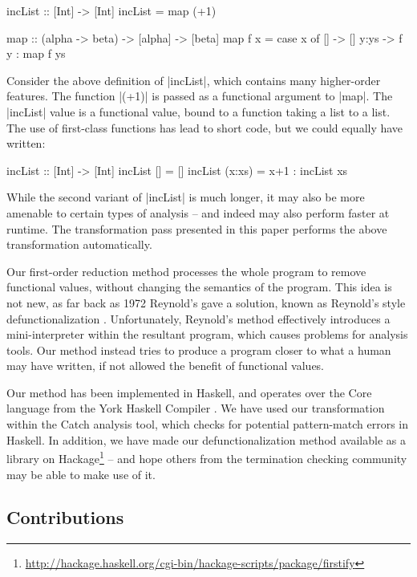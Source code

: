 \documentclass[preprint]{sigplanconf}
\begin{document}
\begin{example}
\label{ex:incList}
\begin{code}
incList :: [Int] -> [Int]
incList = map (+1)

map :: (alpha -> beta) -> [alpha] -> [beta]
map f x = case  x of
                []    -> []
                y:ys  -> f y : map f ys
\end{code}

Consider the above definition of |incList|, which contains many higher-order features. The function |(+1)| is passed as a functional argument to |map|. The |incList| value is a functional value, bound to a function taking a list to a list. The use of first-class functions has lead to short code, but we could equally have written:

\begin{code}
incList :: [Int] -> [Int]
incList []      = []
incList (x:xs)  = x+1 : incList xs
\end{code}

While the second variant of |incList| is much longer, it may also be more amenable to certain types of analysis -- and indeed may also perform faster at runtime. The transformation pass presented in this paper performs the above transformation automatically.
\end{example}

Our first-order reduction method processes the whole program to remove functional values, without changing the semantics of the program. This idea is not new, as far back as 1972 Reynold's gave a solution, known as Reynold's style defunctionalization \cite{reynolds:defunc}. Unfortunately, Reynold's method effectively introduces a mini-interpreter within the resultant program, which causes problems for analysis tools. Our method instead tries to produce a program closer to what a human may have written, if not allowed the benefit of functional values.

Our method has been implemented in Haskell, and operates over the Core language from the York Haskell Compiler \cite{me:yhc_core}. We have used our transformation within the Catch analysis tool, which checks for potential pattern-match errors in Haskell. In addition, we have made our defunctionalization method available as a library on Hackage\footnote{\url{http://hackage.haskell.org/cgi-bin/hackage-scripts/package/firstify}} -- and hope others from the termination checking community may be able to make use of it.

\subsection{Contributions}
\end{document}
